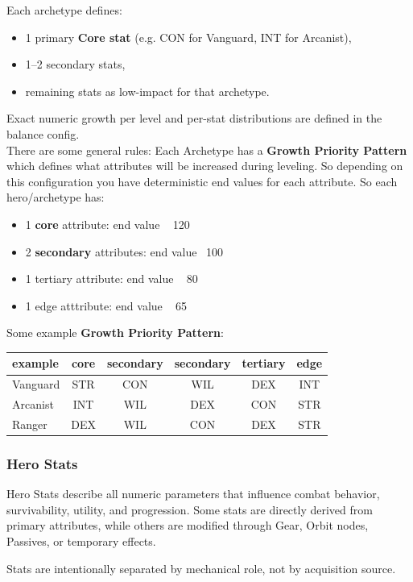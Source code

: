 Each archetype defines:

\begin{itemize}
	\item 1 primary \textbf{Core stat} (e.g. CON for Vanguard, INT for Arcanist),
	\item 1--2 secondary stats,
	\item remaining stats as low-impact for that archetype.
\end{itemize}

Exact numeric growth per level and per-stat distributions are defined in the balance config.\\

There are some general rules: Each Archetype has a \textbf{Growth Priority Pattern} which defines what attributes will be increased during leveling. So depending on this configuration you have deterministic end values for each attribute.
So each hero/archetype has: 
\begin{itemize}
	\item 1 \textbf{core} attribute: end value ~ 120
	\item 2 \textbf{secondary} attributes: end value ~100
	\item 1 tertiary attribute: end value ~ 80
	\item 1 edge atttribute: end value ~ 65
\end{itemize} 

Some example \textbf{Growth Priority Pattern}:\\
\begin{tabular}{l|c|c|c|c|c}
	example & core & secondary & secondary & tertiary & edge \\ \hline
	Vanguard  & STR & CON & WIL & DEX & INT \\
	Arcanist & INT & WIL & DEX & CON & STR \\
	Ranger & DEX & WIL & CON & DEX & STR \\
\end{tabular}

\subsubsection{Hero Stats}

Hero Stats describe all numeric parameters that influence combat behavior, survivability, utility, and progression.
Some stats are directly derived from primary attributes, while others are modified through Gear, Orbit nodes, Passives, or temporary effects.

Stats are intentionally separated by mechanical role, not by acquisition source.
